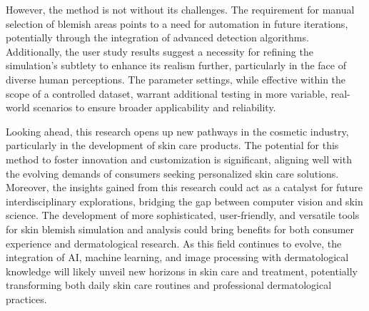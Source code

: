 \begin{spacing}{1.5}
However, the method is not without its challenges. The requirement for manual selection of blemish areas points to a need for automation in future iterations, potentially through the integration of advanced detection algorithms. Additionally, the user study results suggest a necessity for refining the simulation's subtlety to enhance its realism further, particularly in the face of diverse human perceptions. The parameter settings, while effective within the scope of a controlled dataset, warrant additional testing in more variable, real-world scenarios to ensure broader applicability and reliability.

Looking ahead, this research opens up new pathways in the cosmetic industry, particularly in the development of skin care products. The potential for this method to foster innovation and customization is significant, aligning well with the evolving demands of consumers seeking personalized skin care solutions. Moreover, the insights gained from this research could act as a catalyst for future interdisciplinary explorations, bridging the gap between computer vision and skin science. The development of more sophisticated, user-friendly, and versatile tools for skin blemish simulation and analysis could bring benefits for both consumer experience and dermatological research. As this field continues to evolve, the integration of AI, machine learning, and image processing with dermatological knowledge will likely unveil new horizons in skin care and treatment, potentially transforming both daily skin care routines and professional dermatological practices.

\end{spacing}
    
\newpage
